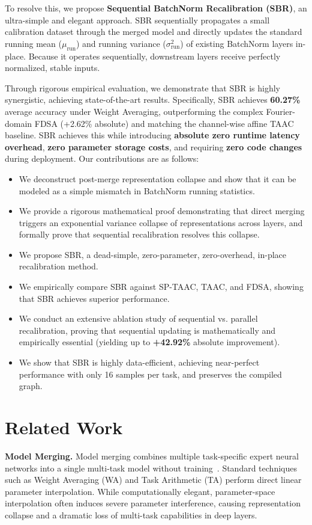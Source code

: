 \documentclass{article}
\theoremstyle{plain}
\theoremstyle{definition}
\theoremstyle{remark}
\begin{document}
To resolve this, we propose \textbf{Sequential BatchNorm Recalibration (SBR)}, an ultra-simple and elegant approach. SBR sequentially propagates a small calibration dataset through the merged model and directly updates the standard running mean ($\mu_{\text{run}}$) and running variance ($\sigma^2_{\text{run}}$) of existing BatchNorm layers in-place. Because it operates sequentially, downstream layers receive perfectly normalized, stable inputs.

Through rigorous empirical evaluation, we demonstrate that SBR is highly synergistic, achieving state-of-the-art results. Specifically, SBR achieves \textbf{60.27\%} average accuracy under Weight Averaging, outperforming the complex Fourier-domain FDSA (+2.62\% absolute) and matching the channel-wise affine TAAC baseline. SBR achieves this while introducing \textbf{absolute zero runtime latency overhead}, \textbf{zero parameter storage costs}, and requiring \textbf{zero code changes} during deployment. Our contributions are as follows:
\begin{itemize}
    \item We deconstruct post-merge representation collapse and show that it can be modeled as a simple mismatch in BatchNorm running statistics.
    \item We provide a rigorous mathematical proof demonstrating that direct merging triggers an exponential variance collapse of representations across layers, and formally prove that sequential recalibration resolves this collapse.
    \item We propose SBR, a dead-simple, zero-parameter, zero-overhead, in-place recalibration method.
    \item We empirically compare SBR against SP-TAAC, TAAC, and FDSA, showing that SBR achieves superior performance.
    \item We conduct an extensive ablation study of sequential vs. parallel recalibration, proving that sequential updating is mathematically and empirically essential (yielding up to \textbf{+42.92\%} absolute improvement).
    \item We show that SBR is highly data-efficient, achieving near-perfect performance with only 16 samples per task, and preserves the compiled graph.
\end{itemize}

\section{Related Work}
\label{sec:related}
\textbf{Model Merging.} Model merging combines multiple task-specific expert neural networks into a single multi-task model without training~\cite{wortsman22,ilharco23}. Standard techniques such as Weight Averaging (WA) and Task Arithmetic (TA) perform direct linear parameter interpolation. While computationally elegant, parameter-space interpolation often induces severe parameter interference, causing representation collapse and a dramatic loss of multi-task capabilities in deep layers.
\end{document}

